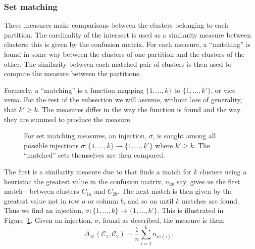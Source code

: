 \documentclass[a4paper]{report}
\newcommand{\clus}{\mathcal{C}}
\newcommand{\partcompare}[1]{\Delta_{\mathcal{#1}}(\clus_1,\clus_2)}
\begin{document}
\subsubsection{Set matching}
\label{sec:set-matching}

These measures make comparisons between the clusters belonging to each
partition.  The cardinality of the intersect is used as a similarity measure
between clusters; this is given by the confusion matrix.  For each measure, a
``matching'' is found in some way between the clusters of one partition and
the clusters of the other.  The similarity between each matched pair of
clusters is then used to compute the measure between the partitions.

Formerly, a ``matching'' is a function mapping $\{1,\dotsc,k\}$ to
$\{1,\dotsc,k'\}$, or vice versa.  For the rest of the subsection we will
assume, without loss of generality, that $k' \geq k$.  The measures differ in
the way the function is found and the way they are summed to produce the
measure.

\begin{figure}
  \Centering
  \caption{For set matching measures, an injection, $\sigma$, is sought among
    all possible injections $\sigma \colon \{1,\dotsc,k\} \to \{1,\dotsc,k'\}$
    where $k' \geq k$.  The ``matched'' sets themselves are then compared.}
  \label{fig:matching}
\end{figure}

The first is a similarity measure due to \citet{meila-2001} that finds a
match for $k$ clusters using a heuristic: the greatest value in the confusion
matrix, $n_{ab}$ say, gives us the first match---between clusters $C_{1a}$ and
$C_{2b}$.  The next match is then given by the greatest value not in row $a$
or column $b$, and so on until $k$ matches are found.  Thus we find an
injection, $\sigma \colon \{1,\dotsc,k\} \to \{1,\dotsc,k'\}$.  This is
illustrated in Figure~\ref{fig:matching}.  Given an injection, $\sigma$, found
as described, the measure is then:
\begin{equation*}
  \partcompare{H} = \frac{1}{n} \sum_{i=1}^{k} n_{i \sigma(i)}.
\end{equation*}
\end{document}
